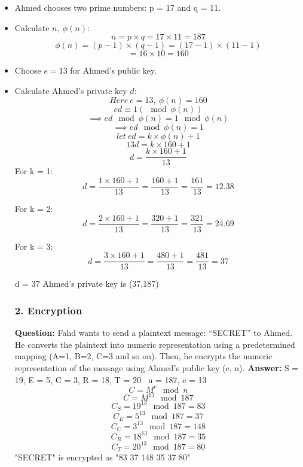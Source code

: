 \documentclass[a4paper]{article}
\begin{document}
\begin{itemize}
    \item Ahmed chooses two prime numbers: p = 17 and q = 11.
    \item Calculate \(n,\ \phi(n) \):
          \[ n = p \times q = 17 \times 11 = 187 \]
          \[\phi(n) = (p - 1) \times (q - 1) = (17 - 1) \times (11 - 1)\]
          \[ = 16 \times 10 = 160\]

    \item Choose \( e = 13 \) for Ahmed’s public key.

    \item Calculate Ahmed’s private key \( d \):
          \[
              Here \ e = 13, \ \phi(n) = 160
          \]
          \[
              ed \equiv 1 (\mod\phi(n))
          \]
          \[
              \implies ed \mod \phi(n) = 1\mod\phi(n)
          \]
          \[
              \implies ed\mod\phi(n) = 1
          \]
          \[
              let \ ed = k \times \phi(n) + 1
          \]
          \[
              13d = k \times 160 + 1
          \]
          \[
              d = \frac{k \times 160 + 1}{13}
          \]
          For k = 1:
          \[
              d = \frac{1 \times 160 + 1}{13} = \frac{160 + 1}{13} = \frac{161}{13} = 12.38
          \]

          For k = 2:
          \[
              d = \frac{2\times 160 + 1}{13} = \frac{320 + 1}{13} = \frac{321}{13} = 24.69
          \]

          For k = 3:
          \[
              d = \frac{3\times 160 + 1}{13} = \frac{480 + 1}{13} = \frac{481}{13} = 37
          \]

          d = 37 \newline Ahmed’s private key is (37,187) \subsubsection*{2. Encryption}
          \textbf{Question: }Fahd wants to send a plaintext message: “SECRET” to Ahmed.
          He converts the plaintext into numeric representation using a predetermined
          mapping (A=1, B=2, C=3 and so on). Then, he encrypts the numeric representation
          of the message using Ahmed’s public key (e, n). \textbf{Answer: } S = 19, E =
          5, C = 3, R = 18, T = 20 \ n = 187, e = 13 \
          \[ C = M^e \mod n \]
          \[ C = M^{13} \mod 187\]
          \[C_S = 19^{13} \mod 187 = 83\]
          \[C_E = 5^{13} \mod 187 = 37\]
          \[C_C = 3^{13} \mod 187 = 148\]
          \[C_R = 18^{13} \mod 187 = 35\]
          \[C_T = 20^{13} \mod 187 = 80\]
          "SECRET" is encrypted as "83 37 148 35 37 80"


\end{itemize}
\end{document}
